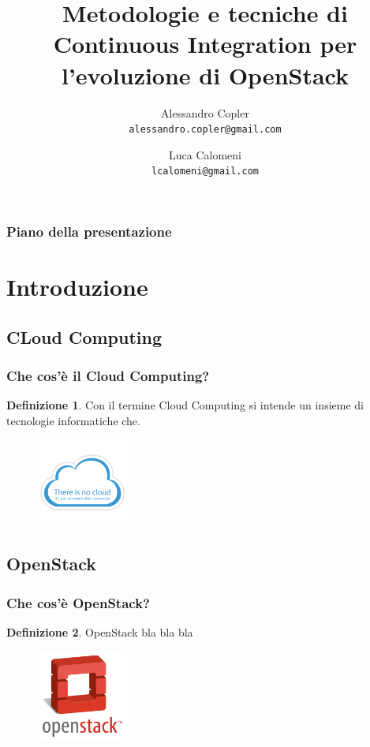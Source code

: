\documentclass{beamer}
\title{Metodologie e tecniche di Continuous Integration per l'evoluzione di OpenStack}
\author[A.Copler e L.Calomeni]{
  Alessandro Copler\\
  \texttt{alessandro.copler@gmail.com}\\
  \and
  Luca Calomeni\\
  \texttt{lcalomeni@gmail.com}
}
\institute[UniDiBergamo]{Università degli studi di Bergamo - Facolta di Ingegneria}
\theoremstyle{definition}
\newtheorem{definizione}{Definizione}
\theoremstyle{plain}
\begin{document}
\begin{frame}
\maketitle
\end{frame}


\begin{frame}
\frametitle{Piano della presentazione}
\tableofcontents
\end{frame}

\section{Introduzione}

\subsection{CLoud
Computing}
\begin{frame}
\frametitle{Che cos'è il Cloud Computing?}
\begin{definizione}
Con il termine \alert{Cloud Computing} si intende un insieme di tecnologie informatiche che.

\begin{figure}[!h]
	\begin{center}
\includegraphics[width=3cm]{cloud.png}
\end{center}
\end{figure}

\end{definizione}
\end{frame}
\subsection{OpenStack}
\begin{frame}
\frametitle{Che cos'è OpenStack?}
\begin{definizione}
\alert{OpenStack} bla bla bla

\begin{figure}[!h]
	\begin{center}
\includegraphics[width=3cm]{openstack.png}
\end{center}
\end{figure}

\end{definizione}
\end{frame}
\end{document}
